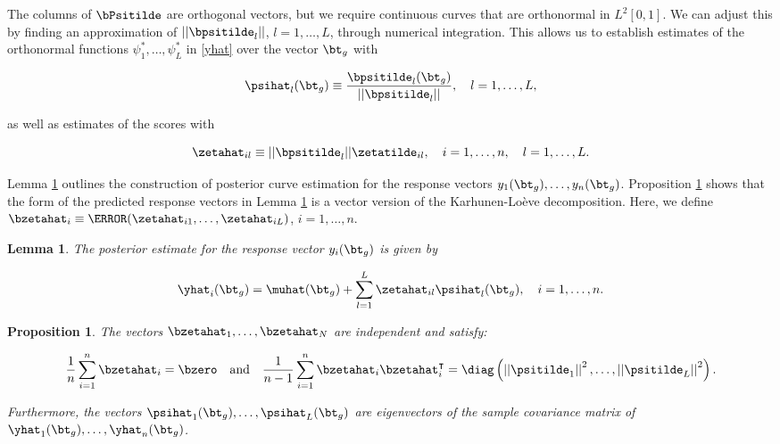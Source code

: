 \documentclass[12pt]{article}
\theoremstyle{plain}
\newtheorem{lemma}[theorem]{Lemma}
\newtheorem{proposition}[theorem]{Proposition}
\theoremstyle{definition}
\theoremstyle{remark}
\begin{document}
\noindent The columns of $\bPsitilde$ are orthogonal vectors, but we require continuous curves that are orthonormal in
$L^2 [0, 1]$. We can adjust this by finding an approximation of $|| \bpsitilde_l ||$, $l = 1, \dots, L$, through numerical
integration. This allows us to establish estimates of the orthonormal functions $\psi^*_1, \dots, \psi^*_L$ in
\eqref{yhat} over the vector $\bt_g$ with

\begin{equation}
	\psihat_l (\bt_g) \equiv \frac{\bpsitilde_l (\bt_g)}{|| \bpsitilde_l ||}, \quad l = 1, \dots, L,
\label{psi_star}
\end{equation}

\noindent as well as estimates of the scores with

\[
	\zetahat_{il} \equiv || \bpsitilde_l || \zetatilde_{il}, \quad i = 1, \dots, n, \quad l = 1, \dots, L.
\]

\noindent Lemma \ref{lem:response_est} outlines the construction of posterior curve estimation for the
response vectors $y_1 (\bt_g),
\dots, y_n (\bt_g)$. Proposition \ref{prop:bi_orthogonal} shows that the form of the predicted response vectors
in Lemma \ref{lem:response_est} is a vector version of the Karhunen-Lo\`{e}ve decomposition. Here, we define
$\bzetahat_i \equiv \T{(\zetahat_{i1}, \dots, \zetahat_{iL})}$, $i = 1, \dots, n$.

\begin{lemma}
	
	The posterior estimate for the response vector $y_i (\bt_g)$ is given by
	
	\begin{equation}
		\yhat_i (\bt_g) = \muhat (\bt_g) + \sum_{l=1}^L \zetahat_{il} \psihat_l (\bt_g), \quad i = 1, \dots, n.
	\label{post_curve_est}
	\end{equation}
	
\label{lem:response_est}
\end{lemma}

\begin{proposition}
	
	The vectors $\bzetahat_1, \dots, \bzetahat_N$ are independent and satisfy:
	
	\[
		\frac{1}{n} \sum_{i=1}^n \bzetahat_i = \bzero \quad
		\text{and} \quad
		\frac{1}{n-1} \sum_{i=1}^n \bzetahat_i \bzetahat^{\intercal}_i = \diag \left(
			\left|\left| \psitilde_1 \right|\right|^2, \dots, \left|\left| \psitilde_L \right|\right|^2
		\right).
	\]
	
	\noindent Furthermore, the vectors $\psihat_1 (\bt_g), \dots, \psihat_L (\bt_g)$ are eigenvectors of the sample
	covariance matrix of $\yhat_1 (\bt_g), \dots, \yhat_n (\bt_g)$.
	
\label{prop:bi_orthogonal}
\end{proposition}
\end{document}
